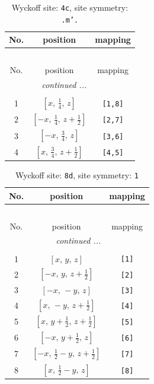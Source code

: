 \documentclass[fleqn,8pt]{jsarticle}
\begin{document}
\renewcommand{\arraystretch}{1.2}
\begin{longtable}{ccc}
\caption{Wyckoff site: {\tt 4c}, site symmetry: {\tt .m'.}}
 \\
 \hline \hline
No. & position & mapping \\ \hline \endfirsthead

\multicolumn{2}{l}{\tablename\ \thetable{}} \\
 \hline \hline
No. & position & mapping \\ \hline \endhead

 \hline \hline
\multicolumn{2}{r}{\footnotesize\it continued ...} \\ \endfoot

 \hline \hline
\multicolumn{2}{r}{} \\ \endlastfoot

1 & $\left[ x,\, \frac{1}{4},\, z \right]$ & {\tt [1,8]} \\ \hline
2 & $\left[ - x,\, \frac{1}{4},\, z + \frac{1}{2} \right]$ & {\tt [2,7]} \\ \hline
3 & $\left[ - x,\, \frac{3}{4},\, z \right]$ & {\tt [3,6]} \\ \hline
4 & $\left[ x,\, \frac{3}{4},\, z + \frac{1}{2} \right]$ & {\tt [4,5]} \\
\end{longtable}
\renewcommand{\arraystretch}{1.2}
\begin{longtable}{ccc}
\caption{Wyckoff site: {\tt 8d}, site symmetry: {\tt 1}}
 \\
 \hline \hline
No. & position & mapping \\ \hline \endfirsthead

\multicolumn{2}{l}{\tablename\ \thetable{}} \\
 \hline \hline
No. & position & mapping \\ \hline \endhead

 \hline \hline
\multicolumn{2}{r}{\footnotesize\it continued ...} \\ \endfoot

 \hline \hline
\multicolumn{2}{r}{} \\ \endlastfoot

1 & $\left[ x,\, y,\, z \right]$ & {\tt [1]} \\ \hline
2 & $\left[ - x,\, y,\, z + \frac{1}{2} \right]$ & {\tt [2]} \\ \hline
3 & $\left[ - x,\, - y,\, z \right]$ & {\tt [3]} \\ \hline
4 & $\left[ x,\, - y,\, z + \frac{1}{2} \right]$ & {\tt [4]} \\ \hline
5 & $\left[ x,\, y + \frac{1}{2},\, z + \frac{1}{2} \right]$ & {\tt [5]} \\ \hline
6 & $\left[ - x,\, y + \frac{1}{2},\, z \right]$ & {\tt [6]} \\ \hline
7 & $\left[ - x,\, \frac{1}{2} - y,\, z + \frac{1}{2} \right]$ & {\tt [7]} \\ \hline
8 & $\left[ x,\, \frac{1}{2} - y,\, z \right]$ & {\tt [8]} \\
\end{longtable}
\end{document}
